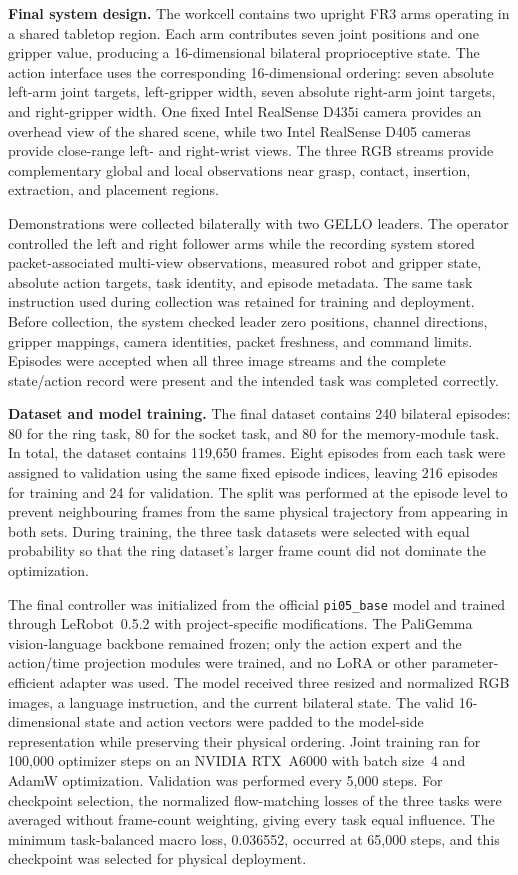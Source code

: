 \begin{digest}
\noindent\textbf{Final system design.}
The workcell contains two upright FR3 arms operating in a shared tabletop region. Each arm contributes seven joint positions and one gripper value, producing a 16-dimensional bilateral proprioceptive state. The action interface uses the corresponding 16-dimensional ordering: seven absolute left-arm joint targets, left-gripper width, seven absolute right-arm joint targets, and right-gripper width. One fixed Intel RealSense D435i camera provides an overhead view of the shared scene, while two Intel RealSense D405 cameras provide close-range left- and right-wrist views. The three RGB streams provide complementary global and local observations near grasp, contact, insertion, extraction, and placement regions.

Demonstrations were collected bilaterally with two GELLO leaders. The operator controlled the left and right follower arms while the recording system stored packet-associated multi-view observations, measured robot and gripper state, absolute action targets, task identity, and episode metadata. The same task instruction used during collection was retained for training and deployment. Before collection, the system checked leader zero positions, channel directions, gripper mappings, camera identities, packet freshness, and command limits. Episodes were accepted when all three image streams and the complete state/action record were present and the intended task was completed correctly.

\noindent\textbf{Dataset and model training.}
The final dataset contains 240 bilateral episodes: 80 for the ring task, 80 for the socket task, and 80 for the memory-module task. In total, the dataset contains 119,650 frames. Eight episodes from each task were assigned to validation using the same fixed episode indices, leaving 216 episodes for training and 24 for validation. The split was performed at the episode level to prevent neighbouring frames from the same physical trajectory from appearing in both sets. During training, the three task datasets were selected with equal probability so that the ring dataset's larger frame count did not dominate the optimization.

The final controller was initialized from the official \texttt{pi05\_base} model and trained through LeRobot~0.5.2 with project-specific modifications. The PaliGemma vision-language backbone remained frozen; only the action expert and the action/time projection modules were trained, and no LoRA or other parameter-efficient adapter was used. The model received three resized and normalized RGB images, a language instruction, and the current bilateral state. The valid 16-dimensional state and action vectors were padded to the model-side representation while preserving their physical ordering. Joint training ran for 100,000 optimizer steps on an NVIDIA RTX~A6000 with batch size~4 and AdamW optimization. Validation was performed every 5,000 steps. For checkpoint selection, the normalized flow-matching losses of the three tasks were averaged without frame-count weighting, giving every task equal influence. The minimum task-balanced macro loss, 0.036552, occurred at 65,000 steps, and this checkpoint was selected for physical deployment.


\end{digest}
